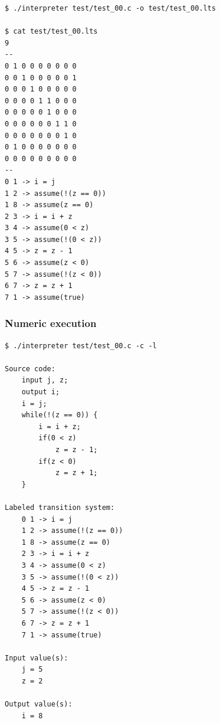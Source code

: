 \documentclass[english,a4paper,oneside]{article}%
\begin{document}
\begin{scriptsize}
\begin{lstlisting}
$ ./interpreter test/test_00.c -o test/test_00.lts 

$ cat test/test_00.lts 
9
--
0 1 0 0 0 0 0 0 0 
0 0 1 0 0 0 0 0 1 
0 0 0 1 0 0 0 0 0 
0 0 0 0 1 1 0 0 0 
0 0 0 0 0 1 0 0 0 
0 0 0 0 0 0 1 1 0 
0 0 0 0 0 0 0 1 0 
0 1 0 0 0 0 0 0 0 
0 0 0 0 0 0 0 0 0 
--
0 1 -> i = j
1 2 -> assume(!(z == 0))
1 8 -> assume(z == 0)
2 3 -> i = i + z
3 4 -> assume(0 < z)
3 5 -> assume(!(0 < z))
4 5 -> z = z - 1
5 6 -> assume(z < 0)
5 7 -> assume(!(z < 0))
6 7 -> z = z + 1
7 1 -> assume(true)
\end{lstlisting}
\end{scriptsize}


\newpage
\subsubsection{Numeric execution}
\begin{scriptsize}
\begin{lstlisting}
$ ./interpreter test/test_00.c -c -l

Source code:
	input j, z;
	output i;
	i = j;
	while(!(z == 0)) {
	    i = i + z;
	    if(0 < z)
	        z = z - 1;
	    if(z < 0)
	        z = z + 1;
	}
	
Labeled transition system:
	0 1 -> i = j
	1 2 -> assume(!(z == 0))
	1 8 -> assume(z == 0)
	2 3 -> i = i + z
	3 4 -> assume(0 < z)
	3 5 -> assume(!(0 < z))
	4 5 -> z = z - 1
	5 6 -> assume(z < 0)
	5 7 -> assume(!(z < 0))
	6 7 -> z = z + 1
	7 1 -> assume(true)

Input value(s):
	j = 5
	z = 2

Output value(s):
	i = 8

\end{lstlisting}
\end{scriptsize}

\newpage
\end{document}
